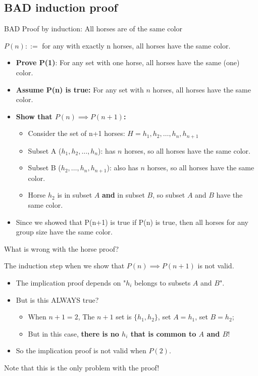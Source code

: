 \subsection{BAD induction proof}

\begin{frame}[t]{BAD Proof by induction: All horses are of the same color}

  $P(n) ::=$ for any  with \alert{exactly n horses}, all horses have the same color.\bigskip

  \begin{itemize}

  \item<2-> {\bf Prove P(1)}: For any set with one horse, all horses have the same (one) color.

  \item<3-> {\bf Assume P(n) is true:} For any set with $n$ horses, all horses have the same color.
  \item<4-> {\bf Show that $P(n) \implies P(n+1)$:}
    \begin{itemize}
    \item <5->Consider the set of n+1 horses: $H = h_1, h_2, \ldots, h_n, h_{n+1}$
    \item <6->Subset A ($h_1, h_2, \ldots, h_n$): has $n$ horses, so all horses have the same color.
    \item <7->Subset B ($h_2, \ldots, h_n, h_{n+1}$): \alert{also} has $n$ horses, so all horses have the same color.
    \item <8->Horse $h_2$ is in subset $A$ {\bf and} in subset $B$, so subset $A$ and $B$ have the same color.
    \end{itemize}
  \item<9-> Since we showed that P(n+1) is true if P(n) is true, then all horses for any group size have the same color.
  \end{itemize}\bigskip

\end{frame}

\begin{frame}{What is wrong with the horse proof?}

  The induction step when we show that $P(n) \implies P(n+1)$ is not valid.\bigskip

  \begin{itemize}
    \item The implication proof depends on "$h_i$ belongs to subsets $A$ and $B$".
    \item But is this ALWAYS true?
    \begin{itemize}
      \item When $n+1 = 2$, The $n+1$ set is $\{h_1, h_2\}$, set $A = h_1$, set $B = h_2$;
      \item But in this case, {\bf there is no $h_i$ that is common to $A$ and $B$}!
    \end{itemize}
    \item So the implication proof is not valid when $P(2)$.
  \end{itemize}\bigskip

  Note that this is the only problem with the proof!
\end{frame}

